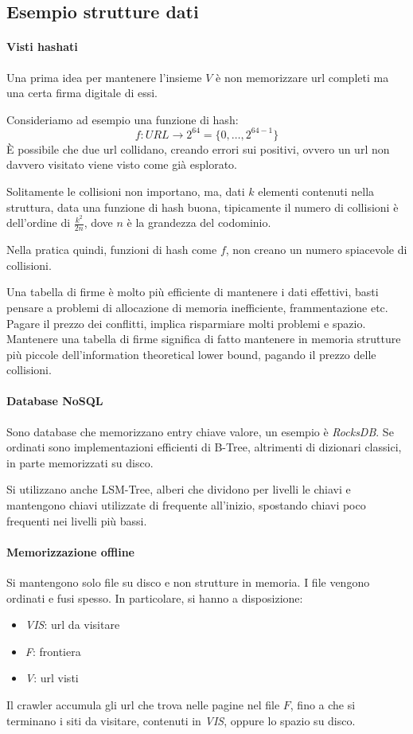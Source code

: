 \subsection{Esempio strutture dati}

\paragraph{Visti hashati}
Una prima idea per mantenere l'insieme $V$ è non memorizzare url completi ma una certa firma digitale 
di essi. 

Consideriamo ad esempio una funzione di hash:
$$f : \mathit{URL} \longrightarrow 2^{64} = \{0, \dots, 2^{64-1}\}$$
È possibile che due url collidano, creando errori sui positivi, ovvero un 
url non davvero visitato viene visto come già esplorato.

Solitamente le collisioni non importano, ma, dati $k$ elementi contenuti 
nella struttura, data una funzione di hash buona, tipicamente il numero di collisioni 
è dell'ordine di $\frac{k^2}{2n}$, dove $n$ è la grandezza del codominio. 

Nella pratica quindi, funzioni di hash come $f$, non creano un numero 
spiacevole di collisioni.
\begin{remark}
    Una tabella di firme è molto più efficiente di mantenere i dati effettivi, 
    basti pensare a problemi di allocazione di memoria inefficiente, frammentazione 
    etc.
    Pagare il prezzo dei conflitti, implica risparmiare molti problemi e spazio.\\
    Mantenere una tabella di firme significa di fatto mantenere in memoria strutture 
    più piccole dell'information theoretical lower bound, pagando il prezzo delle collisioni.
\end{remark}

\paragraph{Database NoSQL}
Sono  database che memorizzano entry chiave valore, 
un esempio è \emph{RocksDB}. Se ordinati sono implementazioni efficienti di B-Tree, 
altrimenti di dizionari classici, in parte memorizzati su disco. 

Si utilizzano anche LSM-Tree, alberi che dividono per livelli le chiavi e mantengono 
chiavi utilizzate di frequente all'inizio, spostando chiavi poco frequenti nei 
livelli più bassi.

\paragraph{Memorizzazione offline} 
Si mantengono solo file su disco e non strutture in memoria. 
I file vengono ordinati e fusi spesso. In particolare, si hanno a disposizione: 
\begin{itemize}
    \item \emph{VIS}: url da visitare
    \item \emph{F}: frontiera
    \item \emph{V}: url visti
\end{itemize}
Il crawler accumula gli url che trova nelle pagine nel file $F$, 
fino a che si terminano i siti da visitare, contenuti 
in \emph{VIS}, oppure lo spazio su disco.

